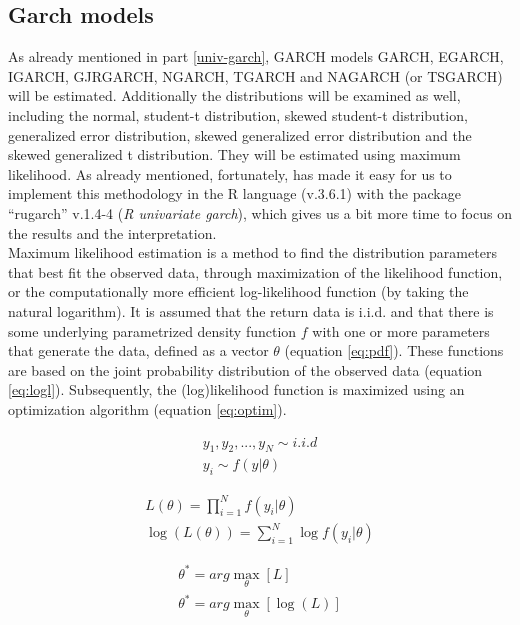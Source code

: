 \documentclass[a4paper, twoside]{templates/ociamthesis}
\begin{document}
\hypertarget{garch-method}{%
\subsection{Garch models}\label{garch-method}}

\noindent As already mentioned in part \ref{univ-garch}, GARCH models GARCH, EGARCH, IGARCH, GJRGARCH, NGARCH, TGARCH and NAGARCH (or TSGARCH) will be estimated. Additionally the distributions will be examined as well, including the normal, student-t distribution, skewed student-t distribution, generalized error distribution, skewed generalized error distribution and the skewed generalized t distribution. They will be estimated using maximum likelihood. As already mentioned, fortunately, \textcite{alexios2020} has made it easy for us to implement this methodology in the R language (v.3.6.1) with the package ``rugarch'' v.1.4-4 (\emph{R univariate garch}), which gives us a bit more time to focus on the results and the interpretation.~\\

\noindent Maximum likelihood estimation is a method to find the distribution parameters that best fit the observed data, through maximization of the likelihood function, or the computationally more efficient log-likelihood function (by taking the natural logarithm). It is assumed that the return data is i.i.d. and that there is some underlying parametrized density function \(f\) with one or more parameters that generate the data, defined as a vector \(\theta\) (equation \eqref{eq:pdf}). These functions are based on the joint probability distribution of the observed data (equation \eqref{eq:logl}). Subsequently, the (log)likelihood function is maximized using an optimization algorithm (equation \eqref{eq:optim}).

\begin{align} 
  y_1,y_2,...,y_N \sim i.i.d
    \\
  y_i \sim f(y|\theta)
 \label{eq:pdf}
\end{align}

\begin{align} 
 L(\theta) = \prod^N_{i=1}f(y_i|\theta)
  \\
 \log(L(\theta)) = \sum^N_{i=1} \log f(y_i |\theta)
 \label{eq:logl}
\end{align}

\begin{align} 
\theta^{*} = arg \max_{\theta} [ L] \\
\theta^{*} = arg \max_{\theta} [\log(L)]
 \label{eq:optim}
\end{align}
\end{document}

